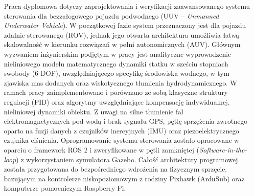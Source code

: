  Praca dyplomowa dotyczy zaprojektowania i weryfikacji zaawansowanego systemu sterowania dla bezzałogowego pojazdu podwodnego (UUV -- \emph{Unmanned Underwater Vehicle}). W początkowej fazie system przeznaczony jest dla pojazdu zdalnie sterowanego (ROV), jednak jego otwarta architektura umożliwia łatwą skalowalność w kierunku rozwiązań w pełni autonomicznych (AUV). Głównym wyzwaniem inżynierskim podjętym w pracy jest analityczne wyprowadzenie nieliniowego modelu matematycznego dynamiki statku w sześciu stopniach swobody (6-DOF), uwzględniającego specyfikę środowiska wodnego, w tym zjawiska mas dodanych oraz wiskotycznego tłumienia hydrodynamicznego. W ramach pracy zaimplementowano i porównano ze sobą klasyczne struktury regulacji (PID) oraz algorytmy uwzględniające kompensację indywidualnej, nieliniowej dynamiki obiektu. Z uwagi na silne tłumienie fal elektromagnetycznych pod wodą i brak sygnału GPS, pętlę sprzężenia zwrotnego oparto na fuzji danych z czujników inercyjnych (IMU) oraz piezoelektrycznego czujnika ciśnienia. Oprogramowanie systemu sterowania zostało opracowane w oparciu o framework ROS 2 i zweryfikowane w pętli zamkniętej (\emph{Software-in-the-loop}) z wykorzystaniem symulatora Gazebo. Całość architektury programowej została przygotowana do bezpośredniego wdrożenia na fizycznym sprzęcie, bazującym na kontrolerze niskopoziomowym z rodziny Pixhawk (ArduSub) oraz komputerze pomocniczym Raspberry Pi.